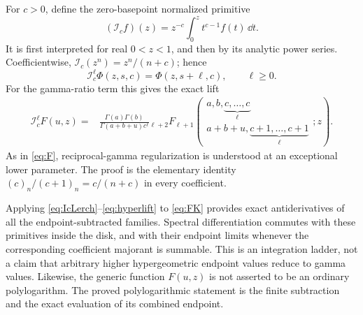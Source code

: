 For $c>0$, define the zero-basepoint normalized primitive
\begin{equation}\label{eq:Ic}
 (\mathcal I_cf)(z)=z^{-c}\int_0^z t^{c-1}f(t)\,\dd t.
\end{equation}
It is first interpreted for real $0<z<1$, and then by its analytic power
series.  Coefficientwise, $\mathcal I_c(z^n)=z^n/(n+c)$; hence
\begin{equation}\label{eq:IcLerch}
 \mathcal I_c^{\ell}\Phi(z,s,c)=\Phi(z,s+\ell,c),\qquad \ell\ge0.
\end{equation}
For the gamma-ratio term this gives the exact lift
\begin{align}
 \mathcal I_c^{\ell}F(u,z)
 ={}&\frac{\Gamma(a)\Gamma(b)}{\Gamma(a+b+u)c^{\ell}}
 {}_{\ell+2}F_{\ell+1}
 \left(\begin{matrix}a,b,\underbrace{c,\ldots,c}_{\ell}\\
 a+b+u,\underbrace{c+1,\ldots,c+1}_{\ell}\end{matrix};z\right).
 \label{eq:hyperlift}
\end{align}
As in \eqref{eq:F}, reciprocal-gamma regularization is understood at an
exceptional lower parameter.  The proof is the elementary identity
$(c)_n/(c+1)_n=c/(n+c)$ in every coefficient.

Applying \eqref{eq:IcLerch}--\eqref{eq:hyperlift} to \eqref{eq:FK} provides
exact antiderivatives of all the endpoint-subtracted families.
Spectral differentiation commutes with these primitives inside the disk,
and with their endpoint limits whenever the corresponding coefficient
majorant is summable.  This is an integration ladder, not a claim that
arbitrary higher hypergeometric endpoint values reduce to gamma values.
Likewise, the generic function $F(u,z)$ is not asserted to be an ordinary
polylogarithm.  The proved polylogarithmic statement is the finite
subtraction and the exact evaluation of its combined endpoint.
